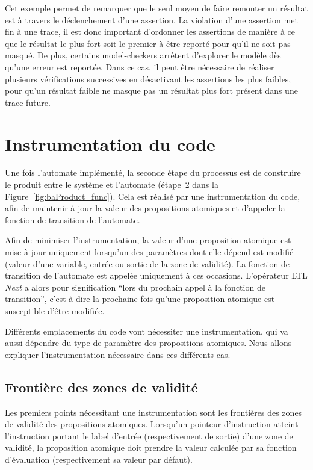 Cet exemple permet de remarquer que le seul moyen de faire remonter un résultat
est à travers le déclenchement d'une assertion. La violation d'une assertion
met fin à une trace, il est donc important d'ordonner les assertions de manière
à ce que le résultat le plus fort soit le premier à être reporté pour qu'il ne soit pas masqué. De plus, certains model-checkers arrêtent d'explorer le modèle
dès qu'une erreur est reportée. Dans ce cas, il peut être nécessaire de réaliser
plusieurs vérifications successives en désactivant les assertions les plus
faibles, pour qu'un résultat faible ne masque pas un résultat plus fort présent
dans une trace future.

\section{Instrumentation du code}

Une fois l'automate implémenté, la seconde étape du processus est de construire
le produit entre le système et l'automate (étape~2 dans la
Figure~\ref{fig:baProduct_func}). Cela est réalisé par une instrumentation du
code, afin de maintenir à jour la valeur des propositions atomiques et d'appeler
la fonction de transition de l'automate.

Afin de minimiser l'instrumentation, la valeur d'une proposition atomique est
mise à jour uniquement lorsqu’un des paramètres dont elle dépend est modifié
(valeur d'une variable, entrée ou sortie de la zone de validité). La fonction de
transition de l'automate est appelée uniquement à ces occasions. L'opérateur
\ac{LTL} \emph{Next} a alors pour signification ``lors du prochain appel à la
fonction de transition'', c'est à dire la prochaine fois qu'une proposition
atomique est susceptible d'être modifiée.

Différents emplacements du code vont nécessiter une instrumentation, qui va
aussi dépendre du type de paramètre des propositions atomiques. Nous allons
expliquer l'instrumentation nécessaire dans ces différents cas.

\subsection{Frontière des zones de validité}

Les premiers points nécessitant une instrumentation sont les frontières
des zones de validité des propositions atomiques. Lorsqu'un pointeur
d'instruction atteint l'instruction portant le label d'entrée
(respectivement de sortie) d'une zone de validité, la proposition
atomique doit prendre la valeur calculée par sa fonction d'évaluation
(respectivement sa valeur par défaut).

